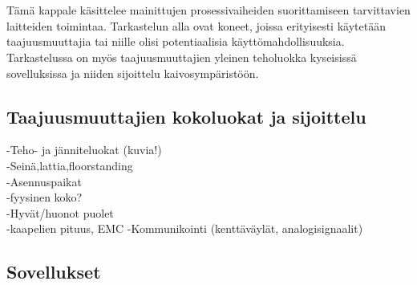 \documentclass[finnish,12pt,a4paper,pdftex,elec,utf8]{aaltothesis}
\begin{document}
\\\\
Tämä kappale käsittelee mainittujen prosessivaiheiden suorittamiseen tarvittavien laitteiden toimintaa. Tarkastelun alla ovat koneet, joissa erityisesti käytetään taajuusmuuttajia tai niille olisi potentiaalisia käyttömahdollisuuksia. Tarkastelussa on myös taajuusmuuttajien yleinen teholuokka kyseisissä sovelluksissa ja niiden sijoittelu kaivosympäristöön.


\subsection{Taajuusmuuttajien kokoluokat ja sijoittelu}

-Teho- ja jänniteluokat (kuvia!)\\
-Seinä,lattia,floorstanding\\
-Asennuspaikat\\
-fyysinen koko?\\
-Hyvät/huonot puolet\\
-kaapelien pituus, EMC
-Kommunikointi (kenttäväylät, analogisignaalit)

\subsection{Sovellukset}
\end{document}
